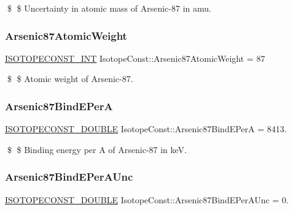 \$ \$ Uncertainty in atomic mass of Arsenic-\/87 in amu. \mbox{\label{group___isotope_const-_arsenic-_as87_gaa45cd41470bbac0a3ddf76f7d94346e6}} 
\subsubsection{\texorpdfstring{Arsenic87\+Atomic\+Weight}{Arsenic87AtomicWeight}}
{\footnotesize\ttfamily \mbox{\hyperlink{group___isotope_const-_macros_ga5f18360b3e99483a35c32d789e62621c}{I\+S\+O\+T\+O\+P\+E\+C\+O\+N\+S\+T\+\_\+\+I\+NT}} Isotope\+Const\+::\+Arsenic87\+Atomic\+Weight = 87}

\$ \$ Atomic weight of Arsenic-\/87. \mbox{\label{group___isotope_const-_arsenic-_as87_ga9f5e550a27cb97ce1a9f5805c76cb45b}} 
\subsubsection{\texorpdfstring{Arsenic87\+Bind\+E\+PerA}{Arsenic87BindEPerA}}
{\footnotesize\ttfamily \mbox{\hyperlink{group___isotope_const-_macros_ga8f45a7272ce02c0b4c65c44636ed719a}{I\+S\+O\+T\+O\+P\+E\+C\+O\+N\+S\+T\+\_\+\+D\+O\+U\+B\+LE}} Isotope\+Const\+::\+Arsenic87\+Bind\+E\+PerA = 8413.}

\$ \$ Binding energy per A of Arsenic-\/87 in keV. \mbox{\label{group___isotope_const-_arsenic-_as87_ga264d9ede97f3d4ec977dabe9b5e3e93d}} 
\subsubsection{\texorpdfstring{Arsenic87\+Bind\+E\+Per\+A\+Unc}{Arsenic87BindEPerAUnc}}
{\footnotesize\ttfamily \mbox{\hyperlink{group___isotope_const-_macros_ga8f45a7272ce02c0b4c65c44636ed719a}{I\+S\+O\+T\+O\+P\+E\+C\+O\+N\+S\+T\+\_\+\+D\+O\+U\+B\+LE}} Isotope\+Const\+::\+Arsenic87\+Bind\+E\+Per\+A\+Unc = 0.}

